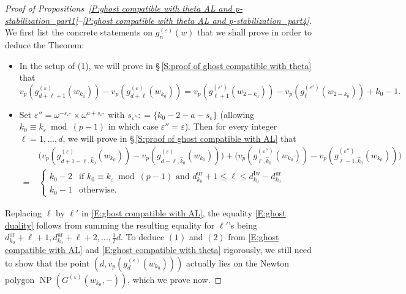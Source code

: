 \documentclass[12pt]{amsart}
\theoremstyle{definition}
\numberwithin{equation}{subsection}
\DeclareMathOperator{\NP}{NP}
\newcommand{\Iw}{\mathrm{Iw}}
\newcommand{\unr}{\mathrm{ur}}
\begin{document}
\begin{proof}[Proof of Propositions~\ref{P:ghost compatible with theta AL and p-stabilization_part1}--\ref{P:ghost compatible with theta AL and p-stabilization_part4}]
We first list the concrete statements on $g_n^{(\varepsilon)}(w)$ that we shall prove in order to deduce the Theorem:
\begin{itemize}
\item[(a)] In the setup of (1),
we will prove in \S\,\ref{S:proof of ghost compatible with theta} that
\begin{equation}
\label{E:ghost compatible with theta}
v_p(g^{(\varepsilon)}_{d+\ell+1}(w_{k_0}))-v_p(g^{(\varepsilon)}_{d+\ell}(w_{k_0})) = v_p(g^{(\varepsilon')}_{\ell+1}(w_{2-{k_0}}))-v_p(g^{(\varepsilon')}_{\ell}(w_{2-{k_0}})) +{k_0}-1.
\end{equation}
\item[(b)]
Set $\varepsilon'' = \omega^{-s_{\varepsilon''}} \times \omega^{a+s_{\varepsilon''}}$ with $s_{\varepsilon''}: = \{{k_0}-  2-a-s_\varepsilon\}$ (allowing $k_0\equiv k_\varepsilon \bmod{(p-1)}$ in which case $\varepsilon''= \varepsilon$).
Then for every integer $\ell =1, \dots, d$, we will prove in \S\,\ref{S:proof of ghost compatible with AL} that
\begin{align}
\label{E:ghost compatible with AL}
&\big(v_p(g^{(\varepsilon)}_{d+1-\ell, \hat k_0}(w_{k_0})) - v_p(g^{(\varepsilon)}_{d-\ell, \hat k_0}(w_{k_0})) \big) + \big(v_p(g^{(\varepsilon'')}_{\ell, \hat k_0}(w_{k_0})) - v_p(g^{(\varepsilon'')}_{\ell-1, \hat k_0}(w_{k_0})) \big) 
\\
\nonumber
=\ & \begin{cases}
{k_0}-2 & \textrm{if }k_0\equiv k_\varepsilon \bmod{(p-1)} \textrm{ and }d_{k_0}^\unr +1\leq  \ell \leq d_{k_0}^\Iw-d_{k_0}^\unr
\\
{k_0}-1 & \textrm{otherwise.}
\end{cases}
\end{align}
\end{itemize}
Replacing $\ell$ by $\ell'$ in \eqref{E:ghost compatible with AL}, the equality \eqref{E:ghost duality} follows from summing the resulting equality for $\ell'$'s being $d_{k_0}^{\unr} + \ell+1, d_{k_0}^{\unr} +\ell+2, \dots, \frac12 d$. To deduce $(1)$ and $(2)$ from \eqref{E:ghost compatible with AL} and \eqref{E:ghost compatible with theta} rigorously, we still need to show that the point $(d, v_p(g_d^{(\varepsilon)}(w_{k_0})))$ actually lies on the Newton polygon $\NP(G^{(\varepsilon)}(w_{k_0}, -))$, which we prove now.


\end{proof}
\end{document}
